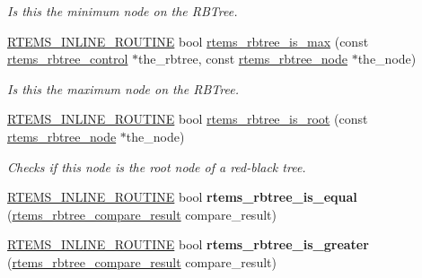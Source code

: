 \begin{DoxyCompactItemize}
\begin{DoxyCompactList}\small\item\em Is this the minimum node on the R\+B\+Tree. \end{DoxyCompactList}\item 
\mbox{\hyperlink{group__RTEMSScoreBaseDefs_gac216239df231d5dbd15e3520b0b9313f}{R\+T\+E\+M\+S\+\_\+\+I\+N\+L\+I\+N\+E\+\_\+\+R\+O\+U\+T\+I\+NE}} bool \mbox{\hyperlink{group__ClassicRBTrees_ga100492e7f80d16061ce9f20616b1838c}{rtems\+\_\+rbtree\+\_\+is\+\_\+max}} (const \mbox{\hyperlink{group__ClassicRBTrees_ga21fe446d0b3cb8b25c814e93357753ef}{rtems\+\_\+rbtree\+\_\+control}} $\ast$the\+\_\+rbtree, const \mbox{\hyperlink{group__ClassicRBTrees_gaef47fc7fc61856c9afbf7f18a26ff80d}{rtems\+\_\+rbtree\+\_\+node}} $\ast$the\+\_\+node)
\begin{DoxyCompactList}\small\item\em Is this the maximum node on the R\+B\+Tree. \end{DoxyCompactList}\item 
\mbox{\hyperlink{group__RTEMSScoreBaseDefs_gac216239df231d5dbd15e3520b0b9313f}{R\+T\+E\+M\+S\+\_\+\+I\+N\+L\+I\+N\+E\+\_\+\+R\+O\+U\+T\+I\+NE}} bool \mbox{\hyperlink{group__ClassicRBTrees_ga25be479d0108ca0c55d179f99cb18f71}{rtems\+\_\+rbtree\+\_\+is\+\_\+root}} (const \mbox{\hyperlink{group__ClassicRBTrees_gaef47fc7fc61856c9afbf7f18a26ff80d}{rtems\+\_\+rbtree\+\_\+node}} $\ast$the\+\_\+node)
\begin{DoxyCompactList}\small\item\em Checks if this node is the root node of a red-\/black tree. \end{DoxyCompactList}\item 
\mbox{\label{group__ClassicRBTrees_gac062041c8d7e92b20256895bdfbc3155}} 
\mbox{\hyperlink{group__RTEMSScoreBaseDefs_gac216239df231d5dbd15e3520b0b9313f}{R\+T\+E\+M\+S\+\_\+\+I\+N\+L\+I\+N\+E\+\_\+\+R\+O\+U\+T\+I\+NE}} bool {\bfseries rtems\+\_\+rbtree\+\_\+is\+\_\+equal} (\mbox{\hyperlink{group__ClassicRBTrees_gaf0f8f451a211561514907b1dc47a6d9d}{rtems\+\_\+rbtree\+\_\+compare\+\_\+result}} compare\+\_\+result)
\item 
\mbox{\label{group__ClassicRBTrees_ga2c33c883aa3bd1b46bec19f99d4ada7a}} 
\mbox{\hyperlink{group__RTEMSScoreBaseDefs_gac216239df231d5dbd15e3520b0b9313f}{R\+T\+E\+M\+S\+\_\+\+I\+N\+L\+I\+N\+E\+\_\+\+R\+O\+U\+T\+I\+NE}} bool {\bfseries rtems\+\_\+rbtree\+\_\+is\+\_\+greater} (\mbox{\hyperlink{group__ClassicRBTrees_gaf0f8f451a211561514907b1dc47a6d9d}{rtems\+\_\+rbtree\+\_\+compare\+\_\+result}} compare\+\_\+result)

\end{DoxyCompactItemize}
